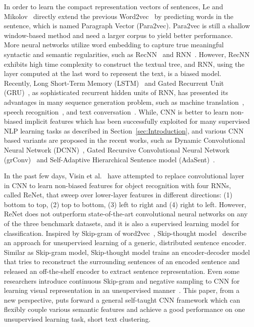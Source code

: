 \documentclass[review]{elsarticle}
\begin{document}
In order to learn the compact representation vectors of sentences, Le and Mikolov~\cite{le2014distributed} directly extend the previous Word2vec~\cite{21_mikolov2013distributed} by predicting words in the sentence, which is named Paragraph Vector (Para2vec). Para2vec is still a shallow window-based method and need a larger corpus to yield better performance. More neural networks utilize word embedding to capture true meaningful syntactic and semantic regularities, such as RecNN~\cite{24_socher2011semi,35_socher2013recursive} and RNN~\cite{38_mikolov2011extensions}. However, RecNN exhibits high time complexity to construct the textual tree, and RNN, using the layer computed at the last word to represent the text, is a biased model. Recently, Long Short-Term Memory (LSTM)~\cite{hochreiter1997long} and Gated Recurrent Unit (GRU)~\cite{cho2014learning}, as sophisticated recurrent hidden units of RNN, has presented its advantages in many sequence generation problem, such as machine translation~\cite{sutskever2014sequence}, speech recognition~\cite{graves2013speech}, and text conversation~\cite{shang2015neural}. While, CNN is better to learn non-biased implicit features which has been successfully exploited for many supervised NLP learning tasks as described in Section~\ref{sec:Introduction}, and various CNN based variants are proposed in the recent works, such as Dynamic Convolutional Neural Network (DCNN)~\cite{16_blunsom2014convolutional}, Gated Recursive Convolutional Neural Network (grConv)~\cite{cho2014properties} and Self-Adaptive Hierarchical Sentence model (AdaSent)~\cite{zhao2015self}.

In the past few days, Visin et al.~\cite{visin2015renet} have attempted to replace convolutional layer in CNN to learn non-biased features for object recognition with four RNNs, called ReNet, that sweep over lower-layer features in different directions: (1) bottom to top, (2) top to bottom, (3) left to right and (4) right to left. However, ReNet does not outperform state-of-the-art convolutional neural networks on any of the three benchmark datasets, and it is also a supervised learning model for classification. Inspired by Skip-gram of word2vec~\cite{mikolov2013efficient,21_mikolov2013distributed}, Skip-thought model~\cite{kiros2015skip} describe an approach for unsupervised learning of a generic, distributed sentence encoder. Similar as Skip-gram model, Skip-thought model trains an encoder-decoder model that tries to reconstruct the surrounding sentences of an encoded sentence and released an off-the-shelf encoder to extract sentence representation. Even some researchers introduce continuous Skip-gram and negative sampling to CNN for learning visual representation in an unsupervised manner~\cite{wang2015unsupervised}.
This paper, from a new perspective, puts forward a general self-taught CNN framework which can flexibly couple various semantic features and achieve a good performance on one unsupervised learning task, short text clustering.
\end{document}
